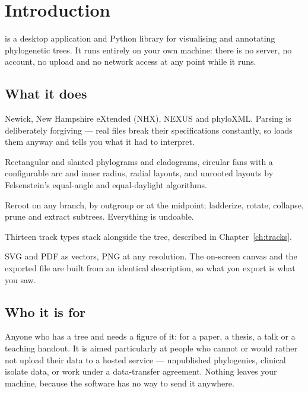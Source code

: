 \chapter{Introduction}
\label{ch:introduction}

\app{} is a desktop application and Python library for visualising and annotating
phylogenetic trees. It runs entirely on your own machine: there is no server, no
account, no upload and no network access at any point while it runs.

\section{What it does}

\begin{description}[style=nextline,leftmargin=0pt,labelindent=0pt,labelwidth=0pt]
  \item[Reads what you already have.]
    Newick, New Hampshire eXtended (NHX), NEXUS and phyloXML. Parsing is
    deliberately forgiving --- real files break their specifications constantly,
    so \app{} loads them anyway and tells you what it had to interpret.
  \item[Draws it many ways.]
    Rectangular and slanted phylograms and cladograms, circular fans with a
    configurable arc and inner radius, radial layouts, and unrooted layouts by
    Felsenstein's equal-angle and equal-daylight algorithms.
  \item[Lets you edit the tree.]
    Reroot on any branch, by outgroup or at the midpoint; ladderize, rotate,
    collapse, prune and extract subtrees. Everything is undoable.
  \item[Annotates it.]
    Thirteen track types stack alongside the tree, described in
    Chapter~\ref{ch:tracks}.
  \item[Exports honestly.]
    SVG and PDF as vectors, PNG at any resolution. The on-screen canvas and the
    exported file are built from an identical description, so what you export is
    what you saw.
\end{description}

\section{Who it is for}

Anyone who has a tree and needs a figure of it: for a paper, a thesis, a talk or
a teaching handout. It is aimed particularly at people who cannot or would rather
not upload their data to a hosted service --- unpublished phylogenies, clinical
isolate data, or work under a data-transfer agreement. Nothing leaves your
machine, because the software has no way to send it anywhere.

